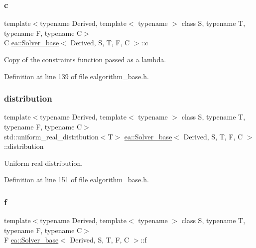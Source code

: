 \subsubsection{\texorpdfstring{c}{c}}
{\footnotesize\ttfamily template$<$typename Derived, template$<$ typename $>$ class S, typename T, typename F, typename C$>$ \\
C \hyperlink{classea_1_1_solver__base}{ea\+::\+Solver\+\_\+base}$<$ Derived, S, T, F, C $>$\+::c\hspace{0.3cm}{\ttfamily [protected]}}



Copy of the constraints function passed as a lambda. 



Definition at line 139 of file ealgorithm\+\_\+base.\+h.

\mbox{\label{classea_1_1_solver__base_ae88f44b13e264e092d3bbaeca6b3bd19}} 
\subsubsection{\texorpdfstring{distribution}{distribution}}
{\footnotesize\ttfamily template$<$typename Derived, template$<$ typename $>$ class S, typename T, typename F, typename C$>$ \\
std\+::uniform\+\_\+real\+\_\+distribution$<$T$>$ \hyperlink{classea_1_1_solver__base}{ea\+::\+Solver\+\_\+base}$<$ Derived, S, T, F, C $>$\+::distribution\hspace{0.3cm}{\ttfamily [protected]}}



Uniform real distribution. 



Definition at line 151 of file ealgorithm\+\_\+base.\+h.

\mbox{\label{classea_1_1_solver__base_ae0a893780c93dfe17c1d17301de6494f}} 
\subsubsection{\texorpdfstring{f}{f}}
{\footnotesize\ttfamily template$<$typename Derived, template$<$ typename $>$ class S, typename T, typename F, typename C$>$ \\
F \hyperlink{classea_1_1_solver__base}{ea\+::\+Solver\+\_\+base}$<$ Derived, S, T, F, C $>$\+::f\hspace{0.3cm}{\ttfamily [protected]}}



